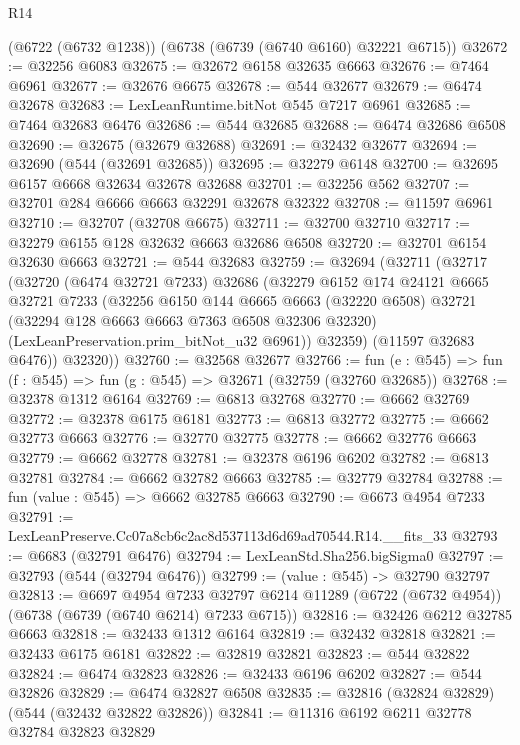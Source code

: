 \begin{lexlean}{R14}
\begin{coremodule}
    (@6722 (@6732 @1238))
    (@6738 (@6739 (@6740 @6160) @32221 @6715))
@32672 := @32256 @6083
@32675 := @32672 @6158 @32635 @6663
@32676 := @7464 @6961
@32677 := @32676 @6675
@32678 := @544 @32677
@32679 := @6474 @32678
@32683 := LexLeanRuntime.bitNot @545 @7217 @6961
@32685 := @7464 @32683 @6476
@32686 := @544 @32685
@32688 := @6474 @32686 @6508
@32690 := @32675 (@32679 @32688)
@32691 := @32432 @32677
@32694 := @32690 (@544 (@32691 @32685))
@32695 := @32279 @6148
@32700 := @32695 @6157 @6668 @32634 @32678 @32688
@32701 := @32256 @562
@32707 := @32701 @284 @6666 @6663 @32291 @32678 @32322
@32708 := @11597 @6961
@32710 := @32707 (@32708 @6675)
@32711 := @32700 @32710
@32717 := @32279 @6155 @128 @32632 @6663 @32686 @6508
@32720 := @32701 @6154 @32630 @6663
@32721 := @544 @32683
@32759 := @32694
    (@32711
      (@32717
        (@32720
          (@6474 @32721 @7233)
          @32686
          (@32279
            @6152
            @174
            @24121
            @6665
            @32721
            @7233
            (@32256
              @6150
              @144
              @6665
              @6663
              (@32220 @6508)
              @32721
              (@32294 @128 @6663 @6663 @7363 @6508 @32306 @32320)
              (LexLeanPreservation.prim_bitNot_u32 @6961))
            @32359)
          (@11597 @32683 @6476))
        @32320))
@32760 := @32568 @32677
@32766 := fun (e : @545) => fun (f : @545) => fun (g : @545) => @32671 (@32759 (@32760 @32685))
@32768 := @32378 @1312 @6164
@32769 := @6813 @32768
@32770 := @6662 @32769
@32772 := @32378 @6175 @6181
@32773 := @6813 @32772
@32775 := @6662 @32773 @6663
@32776 := @32770 @32775
@32778 := @6662 @32776 @6663
@32779 := @6662 @32778
@32781 := @32378 @6196 @6202
@32782 := @6813 @32781
@32784 := @6662 @32782 @6663
@32785 := @32779 @32784
@32788 := fun (value : @545) => @6662 @32785 @6663
@32790 := @6673 @4954 @7233
@32791 := LexLeanPreserve.Cc07a8cb6c2ac8d537113d6d69ad70544.R14.__fits_33
@32793 := @6683 (@32791 @6476)
@32794 := LexLeanStd.Sha256.bigSigma0
@32797 := @32793 (@544 (@32794 @6476))
@32799 := (value : @545) -> @32790 @32797
@32813 := @6697
    @4954
    @7233
    @32797
    @6214
    @11289
    (@6722 (@6732 @4954))
    (@6738 (@6739 (@6740 @6214) @7233 @6715))
@32816 := @32426 @6212 @32785 @6663
@32818 := @32433 @1312 @6164
@32819 := @32432 @32818
@32821 := @32433 @6175 @6181
@32822 := @32819 @32821
@32823 := @544 @32822
@32824 := @6474 @32823
@32826 := @32433 @6196 @6202
@32827 := @544 @32826
@32829 := @6474 @32827 @6508
@32835 := @32816 (@32824 @32829) (@544 (@32432 @32822 @32826))
@32841 := @11316 @6192 @6211 @32778 @32784 @32823 @32829

\end{coremodule}
\end{lexlean}
